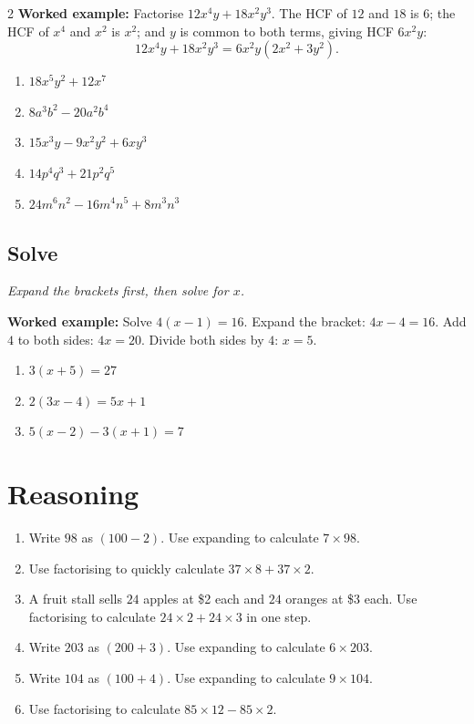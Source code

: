 \documentclass[11pt]{article}
\newcommand{\ans}{\hrulefill}
\newcommand{\anshere}{\par\vspace{0.2em}\noindent\ans\par\vspace{0.2em}}
\begin{document}
\begin{multicols}{2}
\vspace{0.3em}
\noindent\textbf{Worked example:} Factorise $12x^4y+18x^2y^3$. The HCF of $12$ and $18$
is $6$; the HCF of $x^4$ and $x^2$ is $x^2$; and $y$ is common to both terms, giving HCF
$6x^2y$:
\[12x^4y+18x^2y^3 = 6x^2y(2x^2+3y^2).\]
\vspace{0.2em}
\begin{enumerate}[label=(\alph*)]
  \item $18x^5y^2+12x^7$
  \anshere
  \item $8a^3b^2-20a^2b^4$
  \anshere
  \item $15x^3y-9x^2y^2+6xy^3$
  \anshere
  \item $14p^4q^3+21p^2q^5$
  \anshere
  \item $24m^6n^2-16m^4n^5+8m^3n^3$
  \anshere
\end{enumerate}

\vspace{0.5em}
\subsection*{Solve}
\noindent\textit{Expand the brackets first, then solve for $x$.}

\vspace{0.3em}
\noindent\textbf{Worked example:} Solve $4(x-1)=16$. Expand the bracket:
$4x-4=16$. Add $4$ to both sides: $4x=20$. Divide both sides by $4$: $x=5$.
\vspace{0.2em}
\begin{enumerate}[label=(\alph*)]
  \item $3(x+5)=27$
  \anshere
  \item $2(3x-4)=5x+1$
  \anshere
  \item $5(x-2)-3(x+1)=7$
  \anshere
\end{enumerate}
\end{multicols}
\endgroup

\newpage

\section*{Reasoning}

\begin{enumerate}[label=(\alph*)]
  \item Write $98$ as $(100-2)$. Use expanding to calculate $7 \times 98$.
  \anshere
  \item Use factorising to quickly calculate $37 \times 8 + 37 \times 2$.
  \anshere
  \item A fruit stall sells $24$ apples at \$2 each and $24$ oranges at \$3 each. Use
    factorising to calculate $24 \times 2 + 24 \times 3$ in one step.
  \anshere
  \item Write $203$ as $(200+3)$. Use expanding to calculate $6 \times 203$.
  \anshere
  \item Write $104$ as $(100+4)$. Use expanding to calculate $9 \times 104$.
  \anshere
  \item Use factorising to calculate $85 \times 12 - 85 \times 2$.
  \anshere
\end{enumerate}
\end{document}
